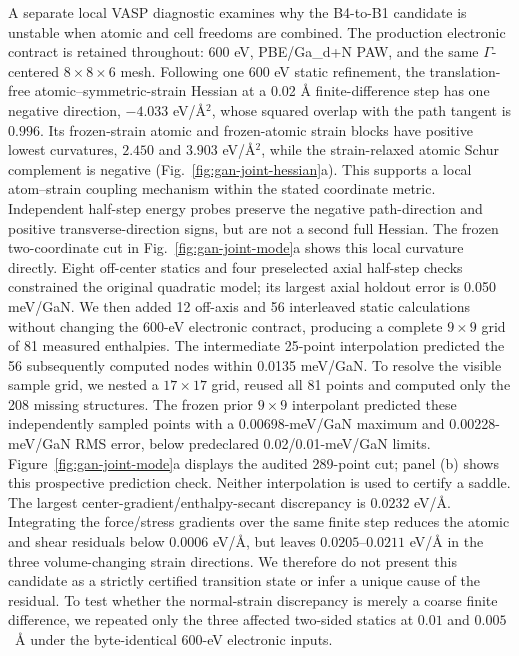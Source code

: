 \documentclass[final,5p,times,twocolumn]{elsarticle}
\begin{document}
A separate local VASP diagnostic examines why the B4-to-B1 candidate is
unstable when atomic and cell freedoms are combined. The production electronic
contract is retained throughout: 600 eV, PBE/Ga\_d+N PAW, and the same
$\Gamma$-centered $8\times8\times6$ mesh. Following one 600 eV static
refinement, the translation-free atomic--symmetric-strain Hessian at a
0.02 \AA{} finite-difference step has one negative direction,
$-4.033$ eV/\AA$^2$, whose squared overlap with the path tangent is $0.996$.
Its frozen-strain atomic and frozen-atomic strain blocks have positive lowest
curvatures, $2.450$ and $3.903$ eV/\AA$^2$, while the strain-relaxed atomic
Schur complement is negative (Fig.~\ref{fig:gan-joint-hessian}a). This supports
a local atom--strain coupling mechanism within the stated coordinate metric.
Independent half-step energy probes preserve the negative path-direction
and positive transverse-direction signs, but are not a second full Hessian.
The frozen two-coordinate cut in Fig.~\ref{fig:gan-joint-mode}a shows this
local curvature directly. Eight off-center statics and four preselected
axial half-step checks constrained the original quadratic model; its largest
axial holdout error is 0.050 meV/GaN. We then added 12 off-axis and 56
interleaved static calculations without changing the 600-eV electronic
contract, producing a complete $9\times9$ grid of 81 measured enthalpies.
The intermediate 25-point interpolation predicted the 56 subsequently
computed nodes within 0.0135 meV/GaN. To resolve the visible sample grid,
we nested a $17\times17$ grid, reused all 81 points and computed only the
208 missing structures. The frozen prior $9\times9$ interpolant predicted
these independently sampled points with a 0.00698-meV/GaN maximum and
0.00228-meV/GaN RMS error, below predeclared 0.02/0.01-meV/GaN limits.
Figure~\ref{fig:gan-joint-mode}a displays the audited 289-point cut;
panel (b) shows this prospective prediction check. Neither interpolation
is used to certify a saddle.
The largest center-gradient/enthalpy-secant discrepancy is $0.0232$
eV/\AA{}. Integrating the force/stress gradients over the same finite step
reduces the atomic and shear residuals below $0.0006$ eV/\AA{}, but leaves
$0.0205$--$0.0211$ eV/\AA{} in the three volume-changing strain directions.
We therefore do not present this candidate as a strictly certified
transition state or infer a unique cause of the residual.
To test whether the normal-strain discrepancy is merely a coarse finite
difference, we repeated only the three affected two-sided statics at
$0.01$ and $0.005$~\AA{} under the byte-identical 600-eV electronic inputs.
\end{document}
